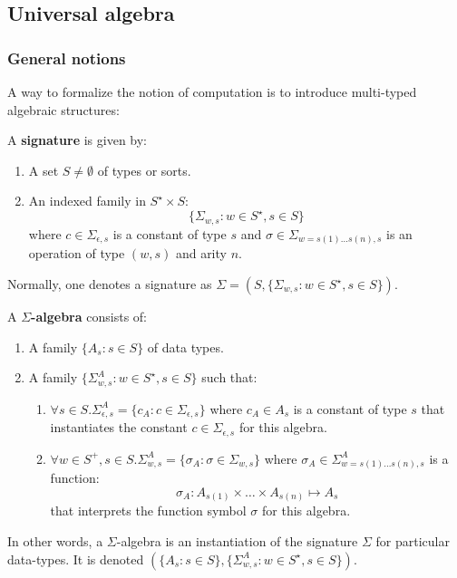 \subsection{Universal algebra}

\subsubsection{General notions}

A way to formalize the notion of computation is to introduce multi-typed algebraic structures:

\begin{definition}
A \textbf{signature} is given by:

\begin{enumerate}
\item A set $S \neq \emptyset$ of types or sorts.
\item An indexed family in $S^{\star} \times S$: $$\{\Sigma_{w,s}:w \in S^{\star}, s \in S\}$$ where $c \in \Sigma_{\epsilon,s}$ is a constant of type $s$ and $\sigma \in \Sigma_{w = s(1) \ldots s(n),s}$ is an operation of type $(w,s)$ and arity $n$. 
\end{enumerate}

Normally, one denotes a signature as $\Sigma = (S,\{\Sigma_{w,s}:w \in S^{\star}, s \in S\})$.

A \textbf{$\Sigma$-algebra} consists of:

\begin{enumerate}
\item A family $\{A_s:s \in S \}$ of data types.
\item A family $\{\Sigma^A_{w,s}:w \in S^{\star}, s \in S\}$ such that:

\begin{enumerate}
\item $\forall s \in S.\Sigma_{\epsilon,s}^A = \{c_A:c \in \Sigma_{\epsilon,s} \}$ where $c_A \in A_s$ is a constant of type $s$ that instantiates the constant $c \in \Sigma_{\epsilon,s}$ for this algebra.

\item $\forall w \in S^+,s \in S.\Sigma_{w,s}^A =\{\sigma_A:\sigma \in \Sigma_{w,s} \}$ where $\sigma_A \in \Sigma_{w = s(1) \ldots s(n),s}^A$ is a function: $$\sigma_A:A_{s(1)} \times \ldots \times A_{s(n)} \mapsto A_s$$ that interprets the function symbol $\sigma$ for this algebra.
\end{enumerate}
\end{enumerate}

In other words, a $\Sigma$-algebra is an instantiation of the signature $\Sigma$ for particular data-types. It is denoted $(\{A_s:s \in S \},\{\Sigma^A_{w,s}:w \in S^{\star}, s \in S\})$.
\end{definition}

